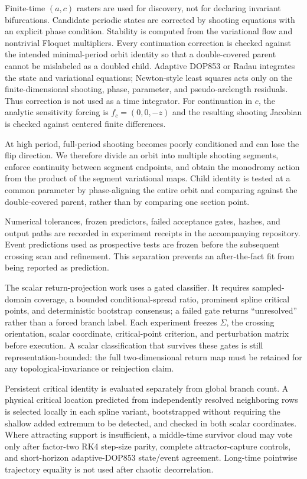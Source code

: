 Finite-time $(a,c)$ rasters are used for discovery, not for declaring invariant
bifurcations.  Candidate periodic states are corrected by shooting equations
with an explicit phase condition.  Stability is computed from the variational
flow and nontrivial Floquet multipliers.  Every continuation correction is
checked against the intended minimal-period orbit identity so that a
double-covered parent cannot be mislabeled as a doubled child.  Adaptive
DOP853 or Radau integrates the state and variational equations; Newton-style
least squares acts only on the finite-dimensional shooting, phase, parameter,
and pseudo-arclength residuals.  Thus correction is not used as a time
integrator.  For continuation in $c$, the analytic sensitivity forcing is
$f_c=(0,0,-z)$ and the resulting shooting Jacobian is checked against centered
finite differences.

At high period, full-period shooting becomes poorly conditioned and can lose
the flip direction.  We therefore divide an orbit into multiple shooting
segments, enforce continuity between segment endpoints, and obtain the
monodromy action from the product of the segment variational maps.  Child
identity is tested at a common parameter by phase-aligning the entire orbit and
comparing against the double-covered parent, rather than by comparing one
section point.

Numerical tolerances, frozen predictors, failed acceptance gates, hashes, and
output paths are recorded in experiment receipts in the accompanying
repository.  Event predictions used as prospective tests are frozen before the
subsequent crossing scan and refinement.  This separation prevents an
after-the-fact fit from being reported as prediction.

The scalar return-projection work uses a gated classifier. It requires
sampled-domain coverage, a bounded conditional-spread ratio, prominent
spline critical points, and deterministic bootstrap consensus; a failed gate
returns ``unresolved'' rather than a forced branch label.  Each experiment
freezes $\Sigma$, the crossing orientation, scalar coordinate, critical-point
criterion, and perturbation matrix before execution.  A scalar classification
that survives these gates is still representation-bounded: the full
two-dimensional return map must be retained for any topological-invariance or
reinjection claim.

Persistent critical identity is evaluated separately from global branch
count.  A physical critical location predicted from independently resolved
neighboring rows is selected locally in each spline variant, bootstrapped
without requiring the shallow added extremum to be detected, and checked in
both scalar coordinates.  Where attracting support is insufficient, a
middle-time survivor cloud may vote only after factor-two RK4 step-size parity,
complete attractor-capture controls, and short-horizon adaptive-DOP853
state/event agreement.  Long-time pointwise trajectory equality is not used
after chaotic decorrelation.

